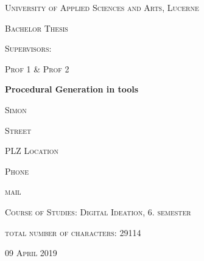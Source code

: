 \begin{titlepage}
\centering
\vspace{1cm}
	{\scshape\LARGE University of Applied Sciences and Arts, Lucerne \par}
	\vspace{0.5cm}
	{\scshape\Large Bachelor Thesis \par}
	\vspace{1cm}
	{\scshape\Large Supervisors: \par}
	{\scshape\Large Prof 1 \& Prof 2\par}
	\vspace{1.5cm}
	{\huge\bf Procedural Generation in tools \par}
	
	\vspace{4cm}
	{\scshape\Large Simon \par}
	{\scshape\Large Street\par}
	{\scshape\Large PLZ Location\par}
	{\scshape\Large Phone\par}
	{\scshape\Large mail \par}
	\vspace{2cm}
	{\scshape\Large Course of Studies: Digital Ideation, 6. semester \par}
	{\scshape\Large total number of characters: 29114 \par}
	\vfill

	{\scshape\large 09 April 2019\par}
\end{titlepage}